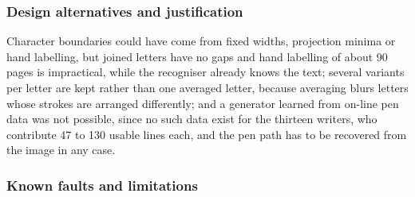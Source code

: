\subsubsection{Design alternatives and justification}

Character boundaries could have come from fixed widths, projection minima or hand labelling, but joined letters have no gaps and hand labelling of about 90 pages is impractical, while the recogniser already knows the text; several variants per letter are kept rather than one averaged letter, because averaging blurs letters whose strokes are arranged differently; and a generator learned from on-line pen data was not possible, since no such data exist for the thirteen writers, who contribute 47 to 130 usable lines each, and the pen path has to be recovered from the image in any case.

\subsubsection{Known faults and limitations}
\label{sec:sty-faults}

